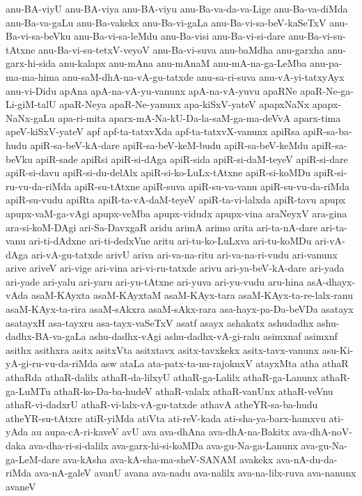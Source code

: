 {anu-BA-viyU
anu-BA-viya
anu-BA-viyu
anu-Ba-va-da-va-Lige
anu-Ba-va-diMda
anu-Ba-va-gaLu
anu-Ba-vakekx
anu-Ba-vi-gaLa
anu-Ba-vi-sa-beV-kaSeTxV
anu-Ba-vi-sa-beVku
anu-Ba-vi-sa-leMdu
anu-Ba-visi
anu-Ba-vi-si-dare
anu-Ba-vi-su-tAtxne
anu-Ba-vi-su-tetxV-veyoV
anu-Ba-vi-suva
anu-baMdha
anu-garxha
anu-garx-hi-sida
anu-kalapx
anu-mAna
anu-mAnaM
anu-mA-na-ga-LeMba
anu-pa-ma-ma-hima
anu-saM-dhA-na-vA-gu-tatxde
anu-sa-ri-suva
anu-vA-yi-tatxyAyx
anu-vi-Didu
apAna
apA-na-vA-yu-vanunx
apA-na-vA-yuvu
apaRNe
apaR-Ne-ga-Li-giM-talU
apaR-Neya
apaR-Ne-yanunx
apa-kiSxV-yateV
apapxNaNx
apapx-NaNx-gaLu
apa-ri-mita
aparx-mA-Na-kU-Da-la-saM-ga-ma-deVvA
aparx-tima
apeV-kiSxV-yateV
apf
apf-ta-tatxvXda
apf-ta-tatxvX-vanunx
apiRsa
apiR-sa-ba-hudu
apiR-sa-beV-kA-dare
apiR-sa-beV-keM-budu
apiR-sa-beV-keMdu
apiR-sa-beVku
apiR-sade
apiRsi
apiR-si-dAga
apiR-sida
apiR-si-daM-teyeV
apiR-si-dare
apiR-si-davu
apiR-si-du-delAlx
apiR-si-ko-LuLx-tAtxne
apiR-si-koMDu
apiR-si-ru-vu-da-riMda
apiR-su-tAtxne
apiR-suva
apiR-su-va-vanu
apiR-su-vu-da-riMda
apiR-su-vudu
apiRta
apiR-ta-vA-daM-teyeV
apiR-ta-vi-lalxda
apiR-tavu
apupx
apupx-vaM-ga-vAgi
apupx-veMba
apupx-vidudx
apupx-vina
araNeyxV
ara-gina
ara-si-koM-DAgi
ari-Sa-DavxgaR
aridu
arimA
arimo
arita
ari-ta-nA-dare
ari-ta-vanu
ari-ti-dAdxne
ari-ti-dedxVne
aritu
ari-tu-ko-LuLxva
ari-tu-koMDu
ari-vA-dAga
ari-vA-gu-tatxde
arivU
ariva
ari-va-na-ritu
ari-va-na-ri-vudu
ari-vanunx
arive
ariveV
ari-vige
ari-vina
ari-vi-ru-tatxde
arivu
ari-ya-beV-kA-dare
ari-yada
ari-yade
ari-yalu
ari-yaru
ari-yu-tAtxne
ari-yuva
ari-yu-vudu
aru-hina
asA-dhayx-vAda
asaM-KAyxta
asaM-KAyxtaM
asaM-KAyx-tara
asaM-KAyx-ta-re-lalx-ranu
asaM-KAyx-ta-rira
asaM-sAkxra
asaM-sAkx-rara
asa-hayx-pa-Da-beVDa
asatayx
asatayxH
asa-tayxru
asa-tayx-vaSeTxV
asatf
asayx
ashakatx
ashudadhx
ashu-dadhx-BA-va-gaLa
ashu-dadhx-vAgi
ashu-dadhx-vA-gi-ralu
asimxnaf
asimxnf
asithx
asithxra
asitx
asitxVta
asitxtavx
asitx-tavxkekx
asitx-tavx-vanunx
asu-Ki-yA-gi-ru-vu-da-riMda
asw
ataLa
ata-patx-ta-nu-rajoknxV
atayxMta
atha
athaR
athaRda
athaR-dalilx
athaR-da-lilxyU
athaR-ga-Lalilx
athaR-ga-Lanunx
athaR-ga-LuMTu
athaR-ko-Da-ba-hudeV
athaR-valalx
athaR-vanUnx
athaR-veVnu
athaR-vi-dadxrU
athaR-vi-lalx-vA-gu-tatxde
athavA
atheYR-sa-ba-hudu
atheYR-su-tAtxre
atiR-yiMda
atiVta
ati-reV-kada
ati-sha-ya-barx-hamxvu
ati-yAda
au
aupa-cA-ri-kaveV
avU
ava
ava-dhAna
ava-dhA-na-Bakitx
ava-dhA-noV-daka
ava-dha-ri-si-dalilx
ava-garx-hi-si-koMDa
ava-gu-Na-ga-Lanunx
ava-gu-Na-ga-LeM-dare
ava-kAsha
ava-kA-sha-ma-sheV-SANAM
avakekx
ava-nA-du-da-riMda
ava-nA-galeV
avanU
avana
ava-nadu
ava-nalilx
ava-na-lilx-ruva
ava-nanunx
avaneV
}
